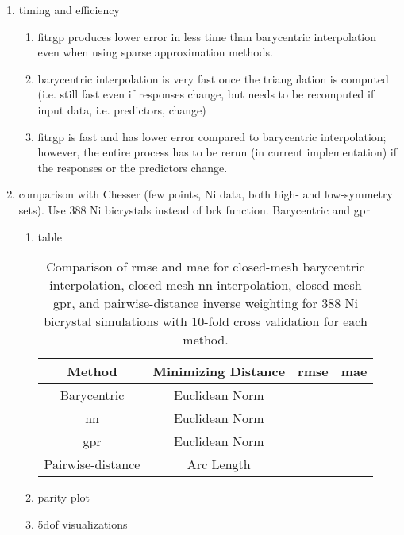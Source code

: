 \documentclass[preprint,12pt]{elsarticle}
\begin{document}
\begin{enumerate}
\begin{figure}
        \label{fig:nndist}
    \end{figure}
    \item timing and efficiency
    \begin{enumerate}
        \item fitrgp produces lower error in less time than barycentric interpolation even when using sparse approximation methods.
        \item barycentric interpolation is very fast once the triangulation is computed (i.e. still fast even if responses change, but needs to be recomputed if input data, i.e. predictors, change)
        \item fitrgp is fast and has lower error compared to barycentric interpolation; however, the entire process has to be rerun (in current implementation) if the responses or the predictors change.
    \end{enumerate}
    \item comparison with Chesser \cite{Chesser2020LearningProperties} (few points, Ni data, both high- and low-symmetry sets). Use 388 Ni bicrystals instead of \gls{brk} function. Barycentric and \gls{gpr}
    \begin{enumerate}
        \item table
        \begin{table}[]
            \centering
            \begin{tabular}{c c c c}
                \hline
                 Method & Minimizing Distance & \acrshort{rmse} & \acrshort{mae} \\
                 \hline
                 Barycentric & Euclidean Norm & & \\
                 \acrshort{nn} & Euclidean Norm & & \\
                 \acrshort{gpr} & Euclidean Norm & & \\
                 Pairwise-distance & Arc Length & &
            \end{tabular}
            \caption{Comparison of \acrfull{rmse} and \acrfull{mae} for closed-mesh barycentric interpolation, closed-mesh \acrfull{nn} interpolation, closed-mesh \acrfull{gpr}, and pairwise-distance inverse weighting for 388 Ni bicrystal simulations with 10-fold cross validation for each method.}
            \label{tab:chesser-comp}
        \end{table}
        \item parity plot
        \item \gls{5dof} visualizations
        \begin{figure}

\end{figure}
\end{enumerate}
\end{enumerate}
\end{document}
